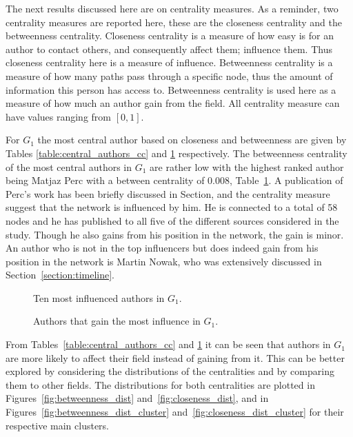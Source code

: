 \documentclass{article}
\theoremstyle{definition}
\begin{document}

The next results discussed here are on centrality measures. As a reminder,
two centrality measures are reported here, these are the closeness centrality
and the betweenness centrality. Closeness centrality is a measure of how
easy is for an author to contact others, and consequently affect them; influence them.
Thus closeness centrality here is a measure of influence. Betweenness centrality
is a measure of how many paths pass through a specific node, thus the amount
of information this person has access to. Betweenness centrality is used here
as a measure of how much an author gain from the field. All centrality measure
can have values ranging from \([0, 1]\).

For \(G_1\)
the most central author based on closeness and betweenness are given by Tables
\ref{table:central_authors_cc} and \ref{table:central_authors} respectively.
The betweenness centrality of the
most central authors in \(G_1\) are rather low with the highest ranked author
being Matjaz Perc with a between centrality of 0.008, Table~\ref{table:central_authors}.
A publication of Perc's work has been briefly discussed in
Section, and the centrality measure suggest that the network is influenced by him.
He is connected to a total of 58 nodes and he has published to all five of the different
sources considered in the study. Though he also gains from his position
in the network, the gain is minor. An author who is not in the top influencers but
does indeed gain from his position in the network is Martin Nowak, who was
extensively discussed in Section~\ref{section:timeline}.

\begin{figure}[!hbtp]
    \centering
    \begin{minipage}{.45\textwidth}
        \centering
        
        \caption{Ten most influenced authors in \(G_1\).}\label{table:central_authors_cc}
    \end{minipage}%
    \begin{minipage}{.45\textwidth}
        \centering
        
        \caption{Authors that gain the most influence in \(G_1\).}\label{table:central_authors}
    \end{minipage}
\end{figure}


From Tables~\ref{table:central_authors_cc} and \ref{table:central_authors} it
can be seen that authors in \(G_1\) are more likely to affect their field instead
of gaining from it. This can be better explored by considering the distributions
of the centralities and by comparing them to other fields.
The distributions for both centralities are
plotted in Figures~\ref{fig:betweenness_dist} and~\ref{fig:closeness_dist}, and
in Figures~\ref{fig:betweenness_dist_cluster} and~\ref{fig:closeness_dist_cluster}
for their respective main clusters.
\end{document}
